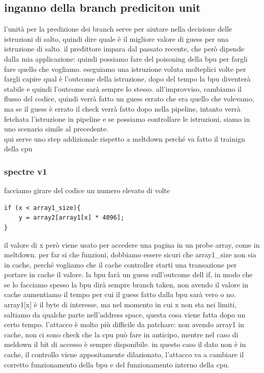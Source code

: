 \documentclass[12pt, oneside]{extbook} %
\begin{document}
\subsection{inganno della branch prediciton unit}
l'unità per la predizione dei branch serve per aiutare nella decisione delle istruzioni di salto, quindi dire quale è il migliore valore di guess per una istruzione di salto. il predittore impara dal passato recente, che però dipende dalla mia applicazione: quindi possiamo fare del poisoning della bpu per fargli fare quello che vogliamo. eseguiamo una istruzione voluta molteplici volte per fargli capire qual è l'outcome della istruzione, dopo del tempo la bpu diventerà stabile e quindi l'outcome sarà sempre lo stesso. all'improvviso, cambiamo il flusso del codice, quindi verrà fatto un guess errato che era quello che volevamo, ma se il guess è errato il check verrà fatto dopo nella pipeline, intanto verrà fetchata l'istruzione in pipeline e se possiamo controllare le istruzioni, siamo in uno scenario simile al precedente.\\ qui serve uno step addizionale rispetto a meltdown perché va fatto il trainign della cpu
\subsubsection{spectre v1}
facciamo girare del codice un numero elevato di volte
\begin{lstlisting}
if (x < array1_size){
	y = array2[array1[x] * 4096];
}
\end{lstlisting}
il valore di x però viene usato per accedere una pagina in un probe array, come in meltdown. per far si che funzioni, dobbiamo essere sicuri che \textsf{array1\_size} non sia in cache, perché vogliamo che il cache controller starti una transazione per portare in cache il valore. la bpu farà un guess sull'outcome dell if, in modo che se lo facciamo spesso la bpu dirà sempre branch taken, non avendo il valore in cache aumentiamo il tempo per cui il guess fatto dalla bpu sarà vero o no. \textsf{array1[x]} è il byte di interesse, ma nel momento in cui x non sta nei limiti, saltiamo da qualche parte nell'address space, questa cosa viene fatta dopo un certo tempo.  l'attacco è molto più difficile da patchare: non avendo array1 in cache, non ci sono check che la cpu può fare in anticipo, mentre nel caso di meldown il bit di accesso è sempre disponibile. in questo caso il dato non è in cache, il controllo viene appositamente dilazionato, l'attacco va a cambiare il corretto funzionamento della bpu e del funzionamento interno della cpu.
\end{document}
